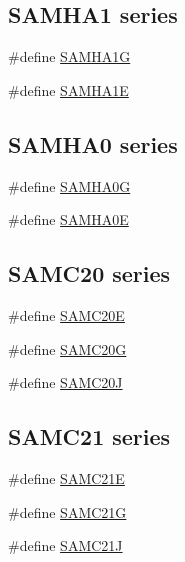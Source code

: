 \subsection*{S\+A\+M\+H\+A1 series}
\begin{DoxyCompactItemize}
\item 
\#define \mbox{\hyperlink{group__sam__part__macros__group_gaee9e99c30b50672f163da40c4cb8cb30}{S\+A\+M\+H\+A1G}}
\item 
\#define \mbox{\hyperlink{group__sam__part__macros__group_ga48f45d0c71e7c076cdce284fc3c6ef73}{S\+A\+M\+H\+A1E}}
\end{DoxyCompactItemize}
\subsection*{S\+A\+M\+H\+A0 series}
\begin{DoxyCompactItemize}
\item 
\#define \mbox{\hyperlink{group__sam__part__macros__group_ga14ccda7d71a5163427e54a4ed0b249a9}{S\+A\+M\+H\+A0G}}
\item 
\#define \mbox{\hyperlink{group__sam__part__macros__group_ga6b59ef1df52e0f4b53ecb47a41728280}{S\+A\+M\+H\+A0E}}
\end{DoxyCompactItemize}
\subsection*{S\+A\+M\+C20 series}
\begin{DoxyCompactItemize}
\item 
\#define \mbox{\hyperlink{group__sam__part__macros__group_gafa6a3f9330468b268688f59c9baa8120}{S\+A\+M\+C20E}}
\item 
\#define \mbox{\hyperlink{group__sam__part__macros__group_gaae8339de60d66fd1ea8ab4d71500eee3}{S\+A\+M\+C20G}}
\item 
\#define \mbox{\hyperlink{group__sam__part__macros__group_gaf87c13f9dc254f1b09d6a4510e1f43bd}{S\+A\+M\+C20J}}
\end{DoxyCompactItemize}
\subsection*{S\+A\+M\+C21 series}
\begin{DoxyCompactItemize}
\item 
\#define \mbox{\hyperlink{group__sam__part__macros__group_ga3f154a978288c66ee8c267dcc90d34bd}{S\+A\+M\+C21E}}
\item 
\#define \mbox{\hyperlink{group__sam__part__macros__group_ga11adf939524e0b28311c847bc8933d4b}{S\+A\+M\+C21G}}
\item 
\#define \mbox{\hyperlink{group__sam__part__macros__group_gaaecc832b9662714c608e2a02449651d7}{S\+A\+M\+C21J}}
\end{DoxyCompactItemize}
